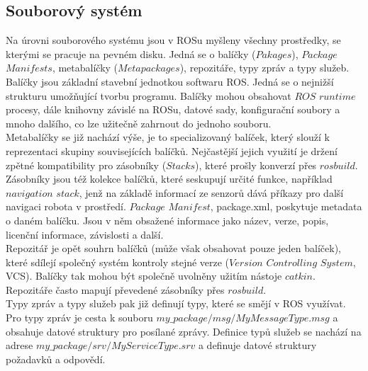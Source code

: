 \documentclass[12pt]{report}
\begin{document}
\subsection{Souborový systém}
Na úrovni souborového systému jsou v ROSu myšleny všechny prostředky, se kterými se pracuje na pevném disku. Jedná se o balíčky ($Pakages$), $Package$ $Manifests$, metabalíčky ($Metapackages$), repozitáře, typy zpráv a typy služeb.\\
\indent Balíčky jsou základní stavební jednotkou softwaru ROS. Jedná se o nejnižší strukturu umožňující tvorbu programu. Balíčky mohou obsahovat $ROS$ $runtime$ procesy, dále knihovny závislé na ROSu, datové sady, konfigurační soubory a mnoho dalšího, co lze užitečně zahrnout do jednoho souboru.\\
\indent Metabalíčky se již nachází výše, je to specializovaný balíček, který slouží k reprezentaci skupiny souvisejících balíčků. Nejčastější jejich využití je držení zpětné kompatibility pro zásobníky ($Stacks$), které prošly konverzí přes $rosbuild$. Zásobníky jsou též kolekce balíčků, které seskupují určité funkce, například $navigation$ $stack$, jenž na základě informací ze senzorů dává příkazy pro další navigaci robota v prostředí. $Package$ $Manifest$, package.xml, poskytuje metadata o daném balíčku. Jsou v něm obsažené informace jako název, verze, popis, licenční informace, závislosti a další.\\
\indent Repozitář je opět souhrn balíčků (může však obsahovat pouze jeden balíček), které sdílejí společný systém kontroly stejné verze ($Version$ $Controlling$ $System$, VCS). Balíčky tak mohou být společně uvolněny užitím nástoje $catkin$. Repozitáře často mapují převedené zásobníky přes $rosbuild$.\\
\indent Typy zpráv a typy služeb pak již definují typy, které se smějí v ROS využívat. Pro typy zpráv je cesta k souboru $my\_package/msg/MyMessageType.msg$ a obsahuje datové struktury pro posílané zprávy. Definice typů služeb se nachází na adrese $my\_package/srv/MyServiceType.srv$ a definuje datové struktury požadavků a odpovědí.\\
\end{document}
